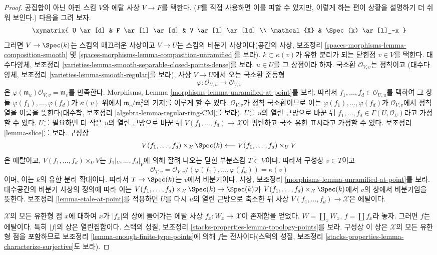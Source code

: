 \begin{proof}
\medskip\noindent
공집합이 아닌 아핀 스킴 $V$와 에탈 사상 $V \to F$를 택한다.
($F$를 직접 사용하면 이를 피할 수 있지만, 이렇게 하는 편이 상황을
설명하기 더 쉬워 보인다.) 다음을 그려 보자.
$$
\xymatrix{
U \ar[d] & F  \ar[l] \ar[d] & V \ar[l] \ar[ld] \\
\mathcal{X} & \Spec(k) \ar[l]_-x
}
$$
그러면 $V \to \Spec(k)$는 스킴의 매끄러운 사상이고 $V \to U$는
스킴의 비분기 사상이다(공간의 사상, 보조정리
\ref{spaces-morphisms-lemma-composition-smooth} 및
\ref{spaces-morphisms-lemma-composition-unramified}를 보라).
$k \subset \kappa(v)$가 유한 분리가 되는 닫힌점 $v \in V$를 택한다.
대수다양체, 보조정리
\ref{varieties-lemma-smooth-separable-closed-points-dense}를 보라.
$u \in U$를 그 상점이라 하자. 국소환 $\mathcal{O}_{V, v}$는 정칙이고
(대수다양체, 보조정리 \ref{varieties-lemma-smooth-regular}를 보라),
사상 $V \to U$에서 오는 국소환 준동형
$$
\varphi : \mathcal{O}_{U, u} \longrightarrow \mathcal{O}_{V, v}
$$
은
$\varphi(\mathfrak m_u)\mathcal{O}_{V, v} = \mathfrak m_v$를 만족한다.
Morphisms, Lemma \ref{morphisms-lemma-unramified-at-point}를 보라. 따라서
$f_1, \ldots, f_d \in \mathcal{O}_{U, u}$를 택하여 그 상들
$\varphi(f_1), \ldots, \varphi(f_d)$가 $\kappa(v)$ 위에서
$\mathfrak m_v/\mathfrak m_v^2$의 기저를 이루게 할 수 있다.
$\mathcal{O}_{V, v}$가 정칙 국소환이므로 이는
$\varphi(f_1), \ldots, \varphi(f_d)$가 $\mathcal{O}_{V, v}$에서
정칙열을 이룸을 뜻한다(대수학, 보조정리
\ref{algebra-lemma-regular-ring-CM}를 보라).
$U$를 $u$의 열린 근방으로 바꾼 뒤
$f_1, \ldots, f_d \in \Gamma(U, \mathcal{O}_U)$라고 가정할 수 있다.
$U$를 필요하면 더 작은 $u$의 열린 근방으로 바꾼 뒤
$V(f_1, \ldots, f_d) \to \mathcal{X}$이 평탄하고 국소 유한 표시라고
가정할 수 있다. 보조정리 \ref{lemma-slice}를 보라. 구성상
$$
V(f_1, \ldots, f_d) \times_\mathcal{X} \Spec(k)
\longleftarrow
V(f_1, \ldots, f_d) \times_U V
$$
은 에탈이고, $V(f_1, \ldots, f_d) \times_U V$는
$f_1|_V, \ldots, f_d|_V$에 의해 잘려 나오는 닫힌 부분스킴
$T \subset V$이다. 따라서 구성상 $v \in T$이고
$$
\mathcal{O}_{T, v} =
\mathcal{O}_{V, v}/(\varphi(f_1), \ldots, \varphi(f_d)) = \kappa(v)
$$
이며, 이는 $k$의 유한 분리 확대이다. 따라서 $T \to \Spec(k)$는
$v$에서 비분기이다. 사상, 보조정리
\ref{morphisms-lemma-unramified-at-point}를 보라. 대수공간의 비분기
사상의 정의에 따라 이는
$V(f_1, \ldots, f_d) \times_\mathcal{X} \Spec(k) \to \Spec(k)$가
$V(f_1, \ldots, f_d) \times_\mathcal{X} \Spec(k)$에서 $v$의 상에서
비분기임을 뜻한다. 보조정리 \ref{lemma-etale-at-point}를 적용하면
$U$를 다시 $u$의 열린 근방으로 축소한 뒤 사상
$V(f_1, \ldots, f_d) \to \mathcal{X}$은 에탈이다.

\medskip\noindent
$\mathcal{X}$의 모든 유한형 점 $x$에 대하여 $x$가 $|f_x|$의 상에
들어가는 에탈 사상 $f_x : W_x \to \mathcal{X}$이 존재함을 얻었다.
$W = \coprod_x W_x$, $f = \coprod f_x$라 놓자. 그러면 $f$는 에탈이다.
특히 $|f|$의 상은 열린집합이다. 스택의 성질, 보조정리
\ref{stacks-properties-lemma-topology-points}를 보라. 구성상 이 상은
$\mathcal{X}$의 모든 유한형 점을 포함하므로 보조정리
\ref{lemma-enough-finite-type-points}에 의해 $f$는 전사이다(스택의 성질,
보조정리 \ref{stacks-properties-lemma-characterize-surjective}도 보라).
\end{proof}

